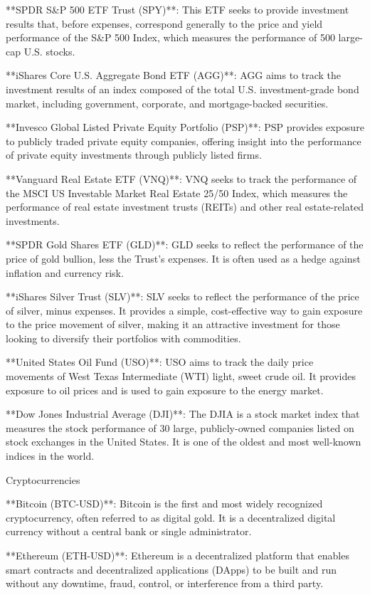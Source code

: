 **SPDR S&P 500 ETF Trust (SPY)**: This ETF seeks to provide investment results that, before expenses, correspond generally to the price and yield performance of the S&P 500 Index, which measures the performance of 500 large-cap U.S. stocks.

**iShares Core U.S. Aggregate Bond ETF (AGG)**: AGG aims to track the investment results of an index composed of the total U.S. investment-grade bond market, including government, corporate, and mortgage-backed securities.

**Invesco Global Listed Private Equity Portfolio (PSP)**: PSP provides exposure to publicly traded private equity companies, offering insight into the performance of private equity investments through publicly listed firms.

**Vanguard Real Estate ETF (VNQ)**: VNQ seeks to track the performance of the MSCI US Investable Market Real Estate 25/50 Index, which measures the performance of real estate investment trusts (REITs) and other real estate-related investments.

**SPDR Gold Shares ETF (GLD)**: GLD seeks to reflect the performance of the price of gold bullion, less the Trust’s expenses. It is often used as a hedge against inflation and currency risk.

**iShares Silver Trust (SLV)**: SLV seeks to reflect the performance of the price of silver, minus expenses. It provides a simple, cost-effective way to gain exposure to the price movement of silver, making it an attractive investment for those looking to diversify their portfolios with commodities.


**United States Oil Fund (USO)**: USO aims to track the daily price movements of West Texas Intermediate (WTI) light, sweet crude oil. It provides exposure to oil prices and is used to gain exposure to the energy market.

**Dow Jones Industrial Average (DJI)**: The DJIA is a stock market index that measures the stock performance of 30 large, publicly-owned companies listed on stock exchanges in the United States. It is one of the oldest and most well-known indices in the world.

Cryptocurrencies

**Bitcoin (BTC-USD)**: Bitcoin is the first and most widely recognized cryptocurrency, often referred to as digital gold. It is a decentralized digital currency without a central bank or single administrator.

**Ethereum (ETH-USD)**: Ethereum is a decentralized platform that enables smart contracts and decentralized applications (DApps) to be built and run without any downtime, fraud, control, or interference from a third party.

